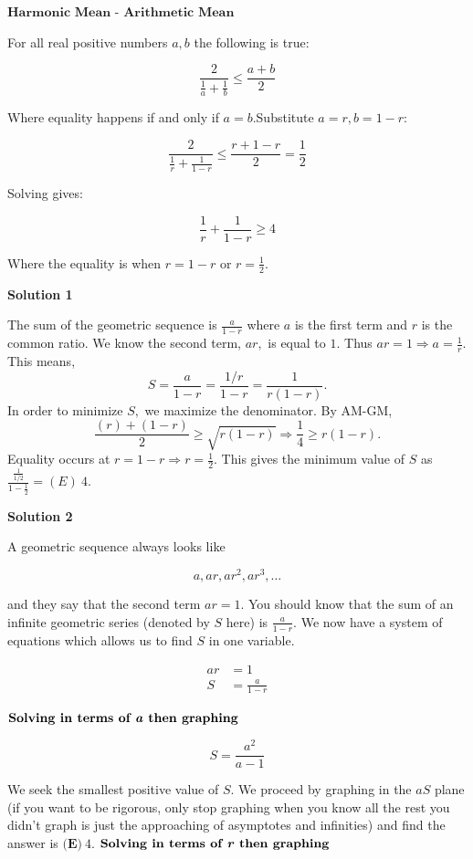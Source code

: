 \begin{enumerate}
 $\textbf{Harmonic Mean - Arithmetic Mean}$

 For all real positive numbers $a,b$ the following is true:

 
 \[\frac{2}{\frac{1}{a}+\frac{1}{b}}\leq\frac{a+b}{2}\]

 Where equality happens if and only if $a=b$.Substitute $a=r,b=1-r$:

 
 \[\frac{2}{\frac{1}{r}+\frac{1}{1-r}}\leq\frac{r+1-r}{2}=\frac{1}{2}\]

 Solving gives:

 
 \[\frac{1}{r}+\frac{1}{1-r}\geq\boxed{4}\]

 Where the equality is when $r=1-r$ or $r=\frac{1}{2}$.

 



\textbf{Solution 1}

The sum of the geometric sequence is $\frac{a}{1 - r}$ where $a$ is the first term and $r$ is the common ratio. We know the second term, $ar,$ is equal to $1.$ Thus $ar = 1 \Rightarrow a = \frac{1}{r}.$ This means,
 \[S = \frac{a}{1 - r} = \frac{1/r}{1 - r} = \frac{1}{r(1 - r)}.\]In order to minimize $S,$ we maximize the denominator. By AM-GM, 
 \[\frac{(r) + (1 - r)}{2} \ge \sqrt{r(1-r)} \Rightarrow \frac{1}{4} \ge r(1-r).\]Equality occurs at $r = 1-r \Rightarrow r = \frac{1}{2}.$ This gives the minimum value of $S$ as $\frac{\frac{1}{1/2}}{1 - \frac{1}{2}} = \boxed{(E)~4}.$




\textbf{Solution 2}

A geometric sequence always looks like

 
 \[a,ar,ar^2,ar^3,\dots\]

 and they say that the second term $ar=1$. You should know that the sum of an infinite geometric series (denoted by $S$ here) is $\frac{a}{1-r}$. We now have a system of equations which allows us to find $S$ in one variable.

 
 \begin{align*} ar&=1 \\ S&=\frac{a}{1-r} \end{align*}

$\textbf{Solving in terms of \textit{a} then graphing}$

 \[S=\frac{a^2}{a-1}\]

 We seek the smallest positive value of $S$. We proceed by graphing in the $aS$ plane (if you want to be rigorous, only stop graphing when you know all the rest you didn't graph is just the approaching of asymptotes and infinities) and find the answer is $\boxed{\textbf{(E)}\ 4}.$
$\textbf{Solving in terms of \textit{r} then graphing}$


\end{enumerate}
